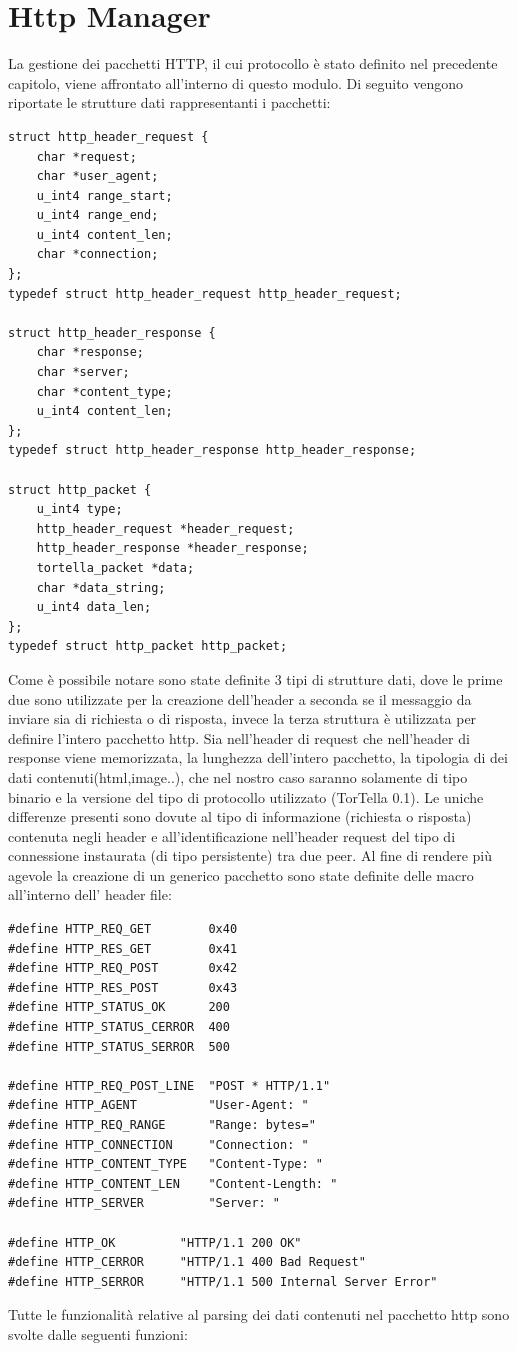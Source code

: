 \section{Http Manager}
La gestione dei pacchetti HTTP, il cui protocollo è stato definito nel precedente capitolo, viene affrontato all'interno di questo modulo. Di seguito vengono riportate le strutture dati rappresentanti i pacchetti:
\begin{lstlisting}[frame=trBL]
struct http_header_request {
	char *request;
	char *user_agent;
	u_int4 range_start;
	u_int4 range_end;
	u_int4 content_len;
	char *connection;
};
typedef struct http_header_request http_header_request;

struct http_header_response {
	char *response;
	char *server;
	char *content_type;
	u_int4 content_len;
};
typedef struct http_header_response http_header_response;

struct http_packet {
	u_int4 type;
	http_header_request *header_request;
	http_header_response *header_response;
	tortella_packet *data;
	char *data_string;
	u_int4 data_len;
};
typedef struct http_packet http_packet;
\end{lstlisting}
Come è possibile notare sono state definite 3 tipi di strutture dati, dove le prime due sono utilizzate per la creazione dell'header a seconda se il messaggio da inviare sia di richiesta o di risposta, invece la terza struttura è utilizzata per definire l'intero pacchetto http. Sia nell'header di request che nell'header di response viene memorizzata, la lunghezza dell'intero pacchetto, la tipologia di dei dati contenuti(html,image..), che nel nostro caso saranno solamente di tipo binario e la versione del tipo di protocollo utilizzato (TorTella 0.1). Le uniche differenze presenti sono dovute al tipo di informazione (richiesta o risposta) contenuta negli header e all'identificazione nell'header request del tipo di connessione instaurata (di tipo persistente) tra due peer.
Al fine di rendere più agevole la creazione di un generico pacchetto sono state definite delle macro all'interno dell' header file:
\begin{lstlisting}[frame=trBL]
#define HTTP_REQ_GET		0x40
#define	HTTP_RES_GET		0x41
#define HTTP_REQ_POST		0x42
#define HTTP_RES_POST		0x43
#define HTTP_STATUS_OK		200
#define	HTTP_STATUS_CERROR	400
#define HTTP_STATUS_SERROR	500

#define HTTP_REQ_POST_LINE	"POST * HTTP/1.1"
#define HTTP_AGENT			"User-Agent: "
#define HTTP_REQ_RANGE		"Range: bytes="
#define HTTP_CONNECTION		"Connection: "
#define HTTP_CONTENT_TYPE	"Content-Type: "
#define HTTP_CONTENT_LEN	"Content-Length: "
#define HTTP_SERVER			"Server: "

#define HTTP_OK			"HTTP/1.1 200 OK"
#define HTTP_CERROR		"HTTP/1.1 400 Bad Request"
#define HTTP_SERROR		"HTTP/1.1 500 Internal Server Error"
\end{lstlisting}
Tutte le funzionalità relative al parsing dei dati contenuti nel pacchetto http sono svolte dalle seguenti funzioni:
